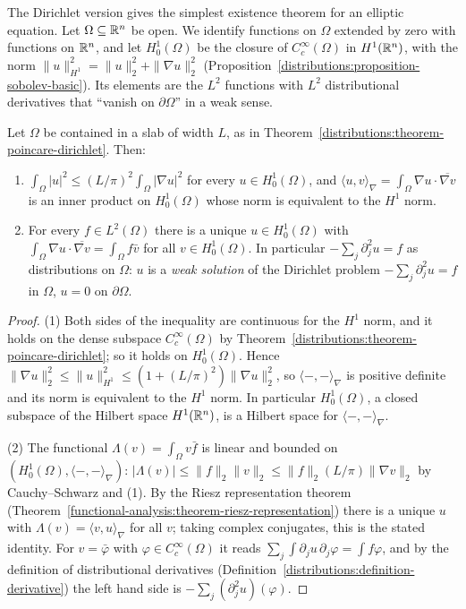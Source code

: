 The Dirichlet version gives the simplest existence theorem for an elliptic equation. Let $\Omega \subseteq \mathbb{R}^n$ be open. We identify functions on $\Omega$ extended by zero with functions on
$\mathbb{R}^n$, and let $H^1_0(\Omega)$ be the closure of $C^\infty_c(\Omega)$ in $H^1(\mathbb{R}^n)$, with the norm $\|u\|_{H^1}^2 = \|u\|_2^2 + \|\nabla u\|_2^2$
(Proposition~\ref{distributions:proposition-sobolev-basic}). Its elements are the $L^2$ functions with $L^2$ distributional derivatives that ``vanish on $\partial\Omega$'' in a weak sense.

\begin{proposition}\label{distributions:proposition-dirichlet-weak}
Let $\Omega$ be contained in a slab of width $L$, as in Theorem~\ref{distributions:theorem-poincare-dirichlet}. Then:
\begin{enumerate}
\item $\int_\Omega|u|^2 \leq (L/\pi)^2\int_\Omega|\nabla u|^2$ for every $u \in H^1_0(\Omega)$, and $\langle u, v\rangle_\nabla = \int_\Omega\nabla u \cdot \overline{\nabla v}$ is an inner product on $H^1_0(\Omega)$ whose norm
is equivalent to the $H^1$ norm.
\item For every $f \in L^2(\Omega)$ there is a unique $u \in H^1_0(\Omega)$ with $\int_\Omega\nabla u \cdot \overline{\nabla v} = \int_\Omega f\bar v$ for all $v \in H^1_0(\Omega)$. In particular
$-\sum_j\partial_j^2u = f$ as distributions on $\Omega$: $u$ is a \emph{weak solution} of the Dirichlet problem $-\sum_j\partial_j^2u = f$ in $\Omega$, $u = 0$ on $\partial\Omega$.
\end{enumerate}
\end{proposition}

\begin{proof}
(1) Both sides of the inequality are continuous for the $H^1$ norm, and it holds on the dense subspace $C^\infty_c(\Omega)$ by Theorem~\ref{distributions:theorem-poincare-dirichlet}; so it holds on
$H^1_0(\Omega)$. Hence $\|\nabla u\|_2^2 \leq \|u\|_{H^1}^2 \leq (1 + (L/\pi)^2)\|\nabla u\|_2^2$, so $\langle -, - \rangle_\nabla$ is positive definite and its norm is equivalent to the $H^1$ norm. In
particular $H^1_0(\Omega)$, a closed subspace of the Hilbert space $H^1(\mathbb{R}^n)$, is a Hilbert space for $\langle -, - \rangle_\nabla$.

(2) The functional $\Lambda(v) = \int_\Omega v\bar f$ is linear and bounded on $(H^1_0(\Omega), \langle -, - \rangle_\nabla)$: $|\Lambda(v)| \leq \|f\|_2\|v\|_2 \leq \|f\|_2(L/\pi)\|\nabla v\|_2$ by Cauchy--Schwarz
and (1). By the Riesz representation theorem (Theorem~\ref{functional-analysis:theorem-riesz-representation}) there is a unique $u$ with $\Lambda(v) = \langle v, u\rangle_\nabla$ for all $v$; taking complex
conjugates, this is the stated identity. For $v = \bar\varphi$ with $\varphi \in C^\infty_c(\Omega)$ it reads $\sum_j\int\partial_ju\,\partial_j\varphi = \int f\varphi$, and by the definition of distributional
derivatives (Definition~\ref{distributions:definition-derivative}) the left hand side is $-\sum_j(\partial_j^2u)(\varphi)$.
\end{proof}

